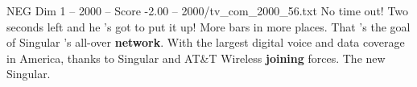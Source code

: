 \begin{textsample}{NEG Dim 1 – 2000 – Score -2.00 – 2000/tv\_com\_2000\_56.txt}  \label{ex:f1_neg_023}
No time out!
Two seconds left and he 's got to put it up!
More bars in more places.
That 's the goal of Singular 's all-over \textbf{network}.
With the largest digital voice and data coverage in America, thanks to Singular and AT\&T Wireless \textbf{joining} forces.
The new Singular.

\end{textsample}
